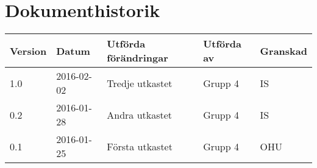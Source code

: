 \documentclass[11pt]{article}
\begin{document}
\section*{Dokumenthistorik}
\begin{table}[h]
\begin{tabular}{|l|l|l|l|l|} \hline

\textbf{Version} & \textbf{Datum} & \textbf{Utförda förändringar} & \textbf{Utförda av} & \textbf{Granskad} \\ \hline
1.0 & 2016-02-02 &  Tredje utkastet & Grupp 4 & IS \\ \hline
0.2 & 2016-01-28 & Andra utkastet & Grupp 4 & IS \\ \hline
0.1 & 2016-01-25 &  Första utkastet & Grupp 4 & OHU \\ \hline
\end{tabular}
\end{table}

\pagebreak
{}
\end{document}
